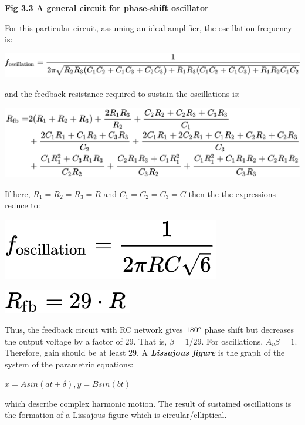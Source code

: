 \begin{center}
    \textbf{Fig 3.3 A general circuit for phase-shift oscillator}
\end{center}
For this particular circuit, assuming an ideal amplifier, the oscillation frequency is:
\begin{center}
    \includegraphics[scale = 0.4]{Documents/foscc.png}
\end{center}
and the feedback resistance required to sustain the oscillations is:
\begin{center}
    \includegraphics[scale = 0.4]{Documents/rfb.png}
\end{center}
If here, $R_1 = R_2 = R_3 = R$ and $C_1 = C_2 = C_3 = C$ then the the expressions reduce to:
\begin{center}
    \includegraphics[scale = 0.4]{Documents/redfoscc.png}
\end{center}
\begin{center}
    \includegraphics[scale = 0.4]{Documents/redrfb.png}
\end{center}
Thus, the feedback circuit with RC network gives $180 \degree$ phase shift but decreases the output 
voltage by a factor of 29. That is, $\beta = 1/29$. For oscillations, $A_v \beta = 1$. Therefore, gain 
should be at least 29.
\clearpage
\noindent
A \textbf{\emph{Lissajous figure}} is the graph of the system of the parametric equations:
\begin{center}
    $x = A sin(at + \delta), y = B sin(bt)$
\end{center}
which describe complex harmonic motion. The result of sustained oscillations is the formation of a Lissajous figure which is circular/elliptical.
